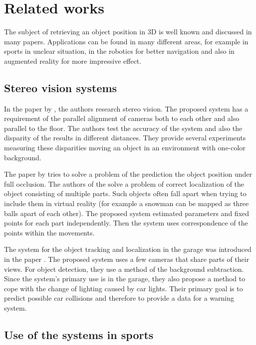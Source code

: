\chapter{Related works} 

The subject of retrieving an object position in 3D is well known and discussed
in many papers. Applications can be found in many different areas, for example in
sports in unclear situation, in the robotics for better navigation and
also in augmented reality for more impressive effect.

\section{Stereo vision systems}

In the paper by \citet*{zheng2010study}, the authors research stereo vision. The
proposed system has a requirement of the parallel alignment of cameras both to
each other and also parallel to the floor. The authors test the accuracy of the
system and also the disparity of the results in different distances. They
provide several experiments measuring these disparities moving an object in an
environment with one-color background.

The paper by \citet*{black2002multi} tries to solve a problem of the prediction
the object position under full occlusion. The authors of the
\citet*{yonemoto1998tracking} solve a problem of correct localization of the
object consisting of multiple parts. Such objects often fall apart when
trying to include them in virtual reality (for example a snowman can be mapped
as three balls apart of each other). The proposed system estimated parameters and
fixed points for each part independently. Then the system uses correspondence
of the points within the movements.

The system for the object tracking and localization in the garage was introduced
in the paper \citet*{ibisch2015arbitrary}. The proposed system uses a few cameras
that share parts of their views. For object detection, they use a method of the
background subtraction. Since the system's primary use is in the garage, they
also propose a method to cope with the change of lighting caused by car
lights. Their primary goal is to predict possible car collisions and therefore
to provide a data for a warning system.

\section{Use of the systems in sports}

